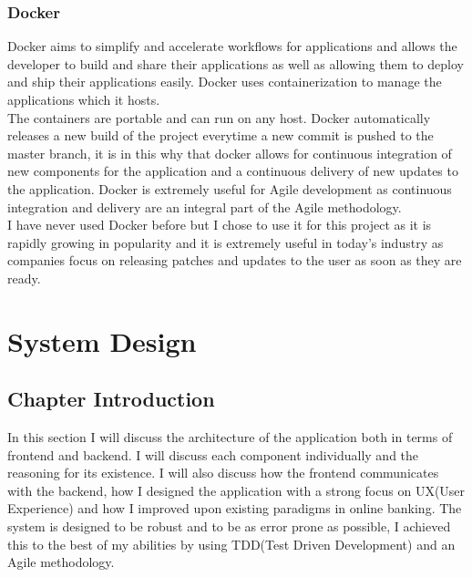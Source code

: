 \subsection{Docker}
Docker aims to simplify and accelerate workflows for applications and allows the developer to build and share their applications as well as allowing them to deploy and ship their applications easily\cite{Docker}.  Docker uses containerization to manage the applications which it hosts.
\\
 The containers are portable and can run on any host.  Docker automatically releases a new build of the project everytime a new commit is pushed to the master branch, it is in this why that docker allows for continuous integration of new components for the application and a continuous delivery of new updates to the application.  Docker is extremely useful for Agile development as continuous integration and delivery are an integral part of the Agile methodology.
\\
  I have never used Docker before but I chose to use it for this project as it is rapidly growing in popularity and it is extremely useful in today's industry as companies focus on releasing patches and updates to the user as soon as they are ready.
\chapter{System Design}
\section{Chapter Introduction}
In this section I will discuss the architecture of the application both in terms of frontend and backend.
I will discuss each component individually and the reasoning for its existence.  I will also discuss how
the frontend communicates with the backend, how I designed the application with a strong focus on UX(User Experience)
and how I improved upon existing paradigms in online banking.  The system is designed to be robust and to be as
error prone as possible, I achieved this to the best of my abilities by using TDD(Test Driven Development) and an
Agile methodology.
